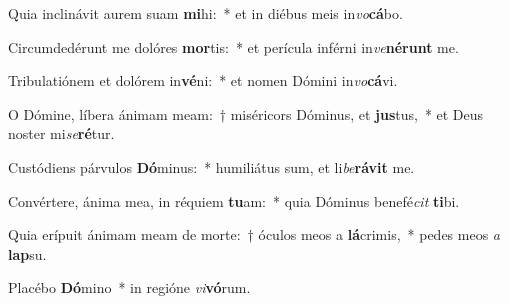 \item Quia inclinávit aurem suam \textbf{mi}hi:~* et in diébus meis in\textit{vo}\textbf{cá}bo.
\item Circumdedérunt me dolóres \textbf{mor}tis:~* et perícula inférni in\textit{ve}\textbf{né}\textbf{runt} me.
\item Tribulatiónem et dolórem in\textbf{vé}ni:~* et nomen Dómini in\textit{vo}\textbf{cá}vi.
\item O Dómine, líbera ánimam meam:~† miséricors Dóminus, et \textbf{jus}tus,~* et Deus noster mi\textit{se}\textbf{ré}tur.
\item Custódiens párvulos \textbf{Dó}minus:~* humiliátus sum, et li\textit{be}\textbf{rá}\textbf{vit} me.
\item Convértere, ánima mea, in réquiem \textbf{tu}am:~* quia Dóminus benefé\textit{cit} \textbf{ti}bi.
\item Quia erípuit ánimam meam de morte:~† óculos meos a \textbf{lá}crimis,~* pedes meos \textit{a} \textbf{lap}su.
\item Placébo \textbf{Dó}mino~* in regióne \textit{vi}\textbf{vó}rum.
